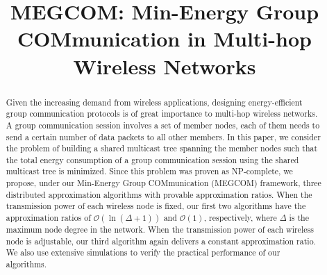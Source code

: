 \documentclass[10pt, conference, compsocconf]{IEEEtran}
\begin{document}
\title{MEGCOM: Min-Energy Group COMmunication in Multi-hop Wireless Networks}

\author{
}

\maketitle

\begin{abstract}
Given the increasing demand from wireless applications, designing energy-efficient group communication protocols is of great importance to multi-hop wireless networks. A group communication session involves a set of member nodes, each of them needs to send a certain number of data packets to all other members. In this paper, we consider the problem of building a shared multicast tree spanning the member nodes such that the total energy consumption of a group communication session using the shared multicast tree is minimized. Since this problem was proven as NP-complete, we propose, under our Min-Energy Group COMmunication (MEGCOM) framework, three distributed approximation algorithms with provable approximation ratios. When the transmission power of each wireless node is fixed, our first two algorithms have the approximation ratios of $\mathcal{O}\left(\ln(\Delta + 1)\right)$ and $\mathcal{O}(1)$, respectively, where $\Delta$ is the maximum node degree in the network. When the transmission power of each wireless node is adjustable, our third algorithm again delivers a constant approximation ratio. We also use extensive simulations to verify the practical performance of our algorithms.
\end{abstract}

\IEEEpeerreviewmaketitle
\end{document}
